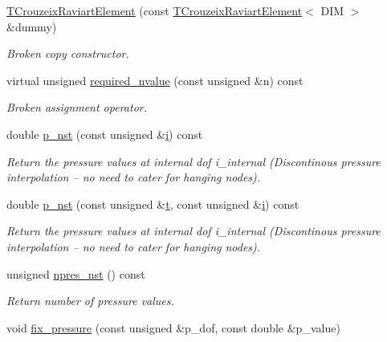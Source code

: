 \begin{DoxyCompactItemize}
\hyperlink{classoomph_1_1TCrouzeixRaviartElement_a1db3af701d4fdb03a8ab059fb99e1117}{T\+Crouzeix\+Raviart\+Element} (const \hyperlink{classoomph_1_1TCrouzeixRaviartElement}{T\+Crouzeix\+Raviart\+Element}$<$ D\+IM $>$ \&dummy)
\begin{DoxyCompactList}\small\item\em Broken copy constructor. \end{DoxyCompactList}\item 
virtual unsigned \hyperlink{classoomph_1_1TCrouzeixRaviartElement_aec9abe53322bfe995c01fcee24ed95eb}{required\+\_\+nvalue} (const unsigned \&n) const
\begin{DoxyCompactList}\small\item\em Broken assignment operator. \end{DoxyCompactList}\item 
double \hyperlink{classoomph_1_1TCrouzeixRaviartElement_a4d3fd2e4d1da1daa9cf53bad6495040e}{p\+\_\+nst} (const unsigned \&\hyperlink{cfortran_8h_adb50e893b86b3e55e751a42eab3cba82}{i}) const
\begin{DoxyCompactList}\small\item\em Return the pressure values at internal dof i\+\_\+internal (Discontinous pressure interpolation -- no need to cater for hanging nodes). \end{DoxyCompactList}\item 
double \hyperlink{classoomph_1_1TCrouzeixRaviartElement_adc29dd0f602b9958c5e3f34518ba35ae}{p\+\_\+nst} (const unsigned \&\hyperlink{cfortran_8h_af6f0bd3dc13317f895c91323c25c2b8f}{t}, const unsigned \&\hyperlink{cfortran_8h_adb50e893b86b3e55e751a42eab3cba82}{i}) const
\begin{DoxyCompactList}\small\item\em Return the pressure values at internal dof i\+\_\+internal (Discontinous pressure interpolation -- no need to cater for hanging nodes). \end{DoxyCompactList}\item 
unsigned \hyperlink{classoomph_1_1TCrouzeixRaviartElement_a289602f8b25e2b538ac4cbe0cc5c22d0}{npres\+\_\+nst} () const
\begin{DoxyCompactList}\small\item\em Return number of pressure values. \end{DoxyCompactList}\item 
void \hyperlink{classoomph_1_1TCrouzeixRaviartElement_aacd1c1546b0fffef8c3d8ac27b4b0372}{fix\+\_\+pressure} (const unsigned \&p\+\_\+dof, const double \&p\+\_\+value)

\end{DoxyCompactItemize}
